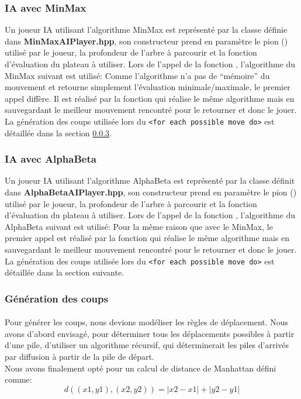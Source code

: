 \documentclass[article, backcover, french, nodocumentinfo]{upmethodology-document}
\begin{document}
			\subsubsection{IA avec MinMax}
					Un joueur IA utilisant l'algorithme MinMax est représenté par la classe  définie dans \textbf{MinMaxAIPlayer.hpp}, son constructeur prend en paramètre le pion () utilisé par le joueur, la profondeur de l'arbre à parcourir et la fonction d’évaluation du plateau à utiliser.
					Lors de l'appel de la fonction , l'algorithme du MinMax suivant est utilisé:
					Comme l'algorithme n'a pas de ``mémoire'' du mouvement et retourne simplement l'évaluation minimale/maximale, le premier appel diffère. Il est réalisé par la fonction  qui réalise le même algorithme mais en sauvegardant le meilleur mouvement rencontré pour le retourner et donc le jouer.\\
					La génération des coups utilisée lors du \texttt{<for each possible move do>} est détaillée dans la section \ref{moveGeneration}.
			\subsubsection{IA avec AlphaBeta}
					Un joueur IA utilisant l'algorithme AlphaBeta est représenté par la classe  définit dans \textbf{AlphaBetaAIPlayer.hpp}, son constructeur prend en paramètre le pion () utilisé par le joueur, la profondeur de l'arbre à parcourir et la fonction d’évaluation du plateau à utiliser.
					Lors de l'appel de la fonction , l'algorithme du AlphaBeta suivant est utilisé:
					Pour la même raison que avec le MinMax, le premier appel est réalisé par la fonction  qui réalise le même algorithme mais en sauvegardant le meilleur mouvement rencontré pour le retourner et donc le jouer.\\
					La génération des coups utilisée lors du \texttt{<for each possible move do>} est détaillée dans la section suivante.
			\subsubsection{Génération des coups}\label{moveGeneration}
				\paragraph{}
					Pour générer les coups, nous devions modéliser les règles de déplacement. Nous avons d'abord envisagé, pour déterminer tous les déplacements possibles à partir d'une pile, d'utiliser un algorithme récursif, qui déterminerait les piles d'arrivés par diffusion à partir de la pile de départ.\\
					Nous avons finalement opté pour un calcul de distance de Manhattan défini comme:
					\[d((x1,y1),(x2,y2)) = |x2 - x1| + |y2 -y1|\]
\end{document}
